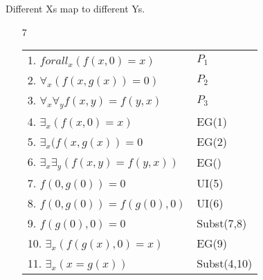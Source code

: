 \documentclass{article}
\begin{document}
	Different Xs map to different Ys.\\
	\begin{enumerate}
		\item[7]
			\begin{tabular}{l l}
				1. $forall _x (f(x,0)=x)$ & $P_1$\\
				2. $\forall _x (f(x,g(x)) = 0)$ & $P_2$\\
				3. $\forall _x \forall _y f(x,y) = f(y,x)$ & $P_3$\\
				4. $\exists _x (f(x,0) = x)$ & EG(1)\\
				5. $\exists _x (f(x,g(x)) = 0$ & EG(2)\\
				6. $\exists _x \exists _y(f(x,y)=f(y,x))$ & EG()\\
				7. $f(0,g(0)) = 0$ & UI(5)\\
				8. $f(0,g(0)) = f(g(0),0)$ & UI(6)\\
				9. $f(g(0),0) = 0$ & Subst(7,8)\\
				10. $\exists _x (f(g(x),0) = x)$ & EG(9)\\
				11. $\exists _x (x = g(x))$ & Subst(4,10)\\
			\end{tabular}
	\end{enumerate}
\end{document}
